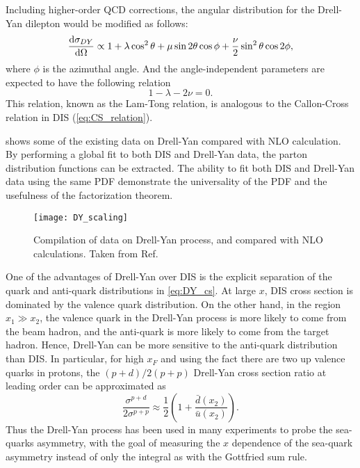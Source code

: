 \documentclass[../main.tex]{subfiles}
\begin{document}
Including higher-order QCD corrections, the angular distribution for the Drell-Yan dilepton would
be modified as follows:
\begin{equation}
	\dv{\sigma_{DY}}{\Omega} \propto 1 + \lambda \cos^2\theta + \mu \sin 2\theta\cos\phi +\frac{\nu}{2}\sin^2\theta\cos 2\phi,
\end{equation}
where $\phi$ is the azimuthal angle. And the angle-independent parameters are expected to have the
following relation \cite{lam1980}
\begin{equation}
	1-\lambda-2\nu=0.
\end{equation}
This relation, known as the Lam-Tong relation, is analogous to the Callon-Cross relation in DIS
(\cref{eq:CS_relation}).

 shows some of the existing data on Drell-Yan compared with NLO calculation. By
performing a global fit to both DIS and Drell-Yan data, the parton distribution
functions can be extracted. The ability to fit both DIS and Drell-Yan data using
the same PDF demonstrate the universality of the PDF and the usefulness of the
factorization theorem.
\begin{figure}[htbp!]
	\centering
	\texttt{[image: DY\_scaling]}
	\label{fig:DY_scaling}
	\caption{Compilation of data on Drell-Yan process, and compared with NLO calculations.
		Taken from Ref.~\cite{mcgaughey1999}}
\end{figure}

One of the advantages of Drell-Yan over DIS is the explicit separation of the quark
and anti-quark distributions in \cref{eq:DY_cs}. At large $x$, DIS cross section
is dominated by the valence quark distribution. On the other hand, in the region $x_1 \gg x_2$,
the valence quark in the Drell-Yan process is more likely to come from the beam
hadron, and the anti-quark is more likely to come from the target hadron. Hence,
Drell-Yan can be more sensitive to the anti-quark distribution than DIS. In
particular, for high $x_F$ and using the fact there are two up valence quarks in
protons, the $(p+d)/2(p+p)$ Drell-Yan cross section ratio at leading order
can be approximated as
\begin{equation}
	\frac{\sigma^{p+d}}{2\sigma^{p+p}} \approx \frac{1}{2} \left( 1+ \frac{\bar{d}\left(x_2\right)}{\bar{u}\left(x_2\right)} \right).
\end{equation}
Thus the Drell-Yan process has been used in many experiments to probe the sea-quarks
asymmetry, with the goal of measuring the $x$ dependence of the sea-quark asymmetry
instead of only the integral as with the Gottfried sum rule.
\end{document}
